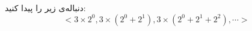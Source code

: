 \p
{}
 دنباله‌ی زیر را پیدا کنید:
$$< 3\times2^0, 3\times(2^0 + 2^1), 3\times(2^0 + 2^1 + 2^2), \cdots >$$